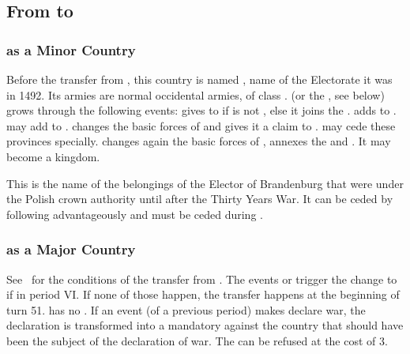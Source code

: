\label{chSpecific:Prussia}
\subsection{From  to }
\subsubsection{ as a Minor Country}
\aparag Before the transfer from , this country is
named , name of the \HRE Electorate it was in 1492. Its armies
are normal occidental armies, of class \CAIII.
\aparag {} (or the , see below)
grows through the following events:
\bparag {} gives  to
 if \POL is not , else it joins the
.
\bparag {} adds  to
.
\bparag {} may add  to
.
\bparag {} changes the basic forces of
 and gives it a claim to . \POL may cede these provinces specially.
\bparag {} changes again the basic forces of
, annexes the  and
. It may become a kingdom.

 This is the name of the
belongings of the Elector of Brandenburg that were under the Polish
crown authority until after the Thirty Years War. It can be ceded by
\POL following  advantageously and must be
ceded during .

\subsubsection{ as a Major Country}
\aparag See~ for the conditions of
the transfer from .
\bparag The events  or 
trigger the change to  if in period VI.
If none of those happen, the transfer happens at the beginning of turn 51.
\aparag \PRU has no \CTZ.
\aparag If an event (of a previous period) makes 
declare war, the declaration is transformed into a mandatory \CB against
the country that should have been the subject of the declaration of
war. The \CB can be refused at the cost of 3\STAB.

